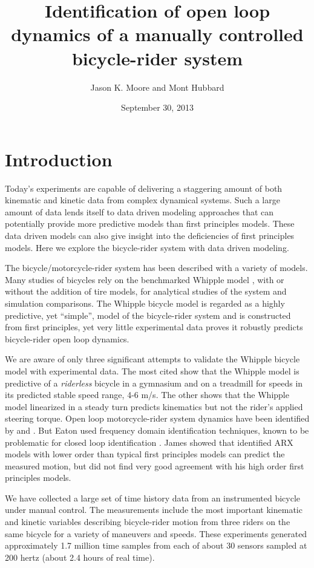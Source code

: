\documentclass[a4paper]{article}
\title{Identification of open loop dynamics of a manually controlled
bicycle-rider system}
\author{Jason K. Moore and Mont Hubbard}
\date{September 30, 2013}
\begin{document}
\maketitle

\section*{Introduction}

Today's experiments are capable of delivering a staggering amount of both
kinematic and kinetic data from complex dynamical systems. Such a large amount
of data lends itself to data driven modeling approaches that can potentially
provide more predictive models than first principles models. These data driven
models can also give insight into the deficiencies of first principles models.
Here we explore the bicycle-rider system with data driven modeling.

The bicycle/motorcycle-rider system has been described with a variety of
models. Many studies of bicycles rely on the benchmarked Whipple model
\cite{Meijaard2007}, with or without the addition of tire models, for
analytical studies of the system and simulation comparisons. The Whipple
bicycle model \cite{Whipple1899} is regarded as a highly predictive, yet
``simple'', model of the bicycle-rider system and is constructed from first
principles, yet very little experimental data proves it robustly predicts
bicycle-rider open loop dynamics.

We are aware of only three significant attempts to validate the Whipple bicycle
model with experimental data. The most cited \cite{Kooijman2008,Kooijman2009}
show that the Whipple model is predictive of a \emph{riderless} bicycle in a
gymnasium and on a treadmill for speeds in its predicted stable speed range,
4-6 m/s. The other \cite{Cain2012} shows that the Whipple model linearized in a
steady turn predicts kinematics but not the rider's applied steering torque.
Open loop motorcycle-rider system dynamics have been identified by
\cite{Eaton1973} and \cite{James2002,James2005}. But Eaton used frequency
domain identification techniques, known to be problematic for closed loop
identification \cite{Ljung1999}. James showed that identified ARX models with
lower order than typical first principles models can predict the measured
motion, but did not find very good agreement with his high order first
principles models.

We have collected a large set of time history data from an instrumented bicycle
under manual control. The measurements include the most important kinematic and
kinetic variables describing bicycle-rider motion from three riders on the same
bicycle for a variety of maneuvers and speeds. These experiments generated
approximately 1.7 million time samples from each of about 30 sensors sampled at
200 hertz (about 2.4 hours of real time).
\end{document}
